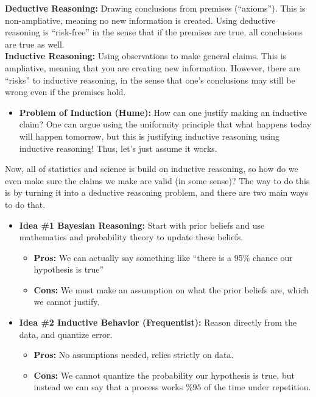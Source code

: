 
\textbf{Deductive Reasoning:} Drawing conclusions from premises (``axioms''). This is non-ampliative, meaning no new information is created. Using deductive reasoning is ``risk-free'' in the sense that if the premises are true, all conclusions are true as well.\\

\textbf{Inductive Reasoning: } Using observations to make general claims. This is ampliative, meaning that you are creating new information. However, there are ``risks'' to inductive reasoning, in the sense that one's conclusions may still be wrong even if the premises hold. 
\begin{itemize}
    \item \textbf{Problem of Induction (Hume): }How can one justify making an inductive claim? One can argue using the uniformity principle that what happens today will happen tomorrow, but this is justifying inductive reasoning using inductive reasoning! Thus, let's just assume it works. 
\end{itemize}


Now, all of statistics and science is build on inductive reasoning, so how do we even make sure the claims we make are valid (in some sense)? The way to do this is by turning it into a deductive reasoning problem, and there are two main ways to do that. 
\begin{itemize}
    \item \textbf{Idea \#1 Bayesian Reasoning: }Start with prior beliefs and use mathematics and probability theory to update these beliefs.
    \begin{itemize}
        \item \textbf{Pros:} We can actually say something like ``there is a 95\% chance our hypothesis is true''
        \item \textbf{Cons:} We must make an assumption on what the prior beliefs are, which we cannot justify.
    \end{itemize}
    \item \textbf{Idea \#2 Inductive Behavior (Frequentist): }Reason directly from the data, and quantize error.
    \begin{itemize}
        \item \textbf{Pros:} No assumptions needed, relies strictly on data.
        \item \textbf{Cons:} We cannot quantize the probability our hypothesis is true, but instead we can say that a process works $\%95$ of the time under repetition.
    \end{itemize}
\end{itemize}
